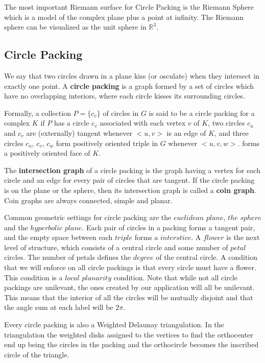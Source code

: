 \documentclass[english]{article}
\begin{document}
  The most important Riemann surface for Circle Packing is the Riemann Sphere which is a model of the complex plane plus a point at infinity. The Riemann sphere can be visualized as the unit sphere in $\mathbb{R}^3$. 


 \subsection{Circle Packing}
  We say that two circles drawn in a plane kiss (or osculate) when they intersect in exactly one point. 
  A \textbf{circle packing} is a graph formed by a set of circles which have no overlapping interiors, where each circle kisses its surrounding circles.
  
  Formally, a collection $P = \{c_v\} $ of circles in $G$ is said to be a circle packing for a complex $K$ if $P$ has a circle $c_v$ associated with each vertex $v$ of $K$, two circles $c_u$ and $c_v$ are (externally) tangent whenever $<u,v>$ is an edge of $K$, and three circles $c_u$, $c_v$, $c_w$ form positively oriented triple in $G$ whenever $<u,v,w>$. forms a positively oriented face of $K$.
   
  The \textbf{intersection graph} of a circle packing is the graph having a vertex for each circle and an edge for every pair of circles that are tangent. 
  If the circle packing is on the plane or the sphere, then its intersection graph is called a \textbf{coin graph}. 
  Coin graphs are always connected, simple and planar. 

    Common geometric settings for circle packing are the $euclidean$ $plane$, $the$ $sphere$ and the $hyperbolic$ $plane$. Each pair of circles in a packing forms a tangent pair, and the empty space between each $triple$ forms a $interstice$. A $flower$ is the next level of structure, which consists of a central circle and some number of $petal$ circles. The number of petals defines the $degree$ of the central circle. A condition that we will enforce on all circle packings is that every circle must have a flower. This condition is a $local$ $planarity$ condition. Note that while not all circle packings are unilevant, the ones created by our application will all be unilevant. This means that the interior of all the circles will be mutually disjoint and that the angle sum at each label will be $2\pi$.
    
    Every circle packing is also a Weighted Delaunay triangulation. In the triangulation the weighted disks assigned to the vertices to find the orthocenter end up being the circles in the packing and the orthocircle becomes the inscribed circle of the triangle. 
    
\end{document}
